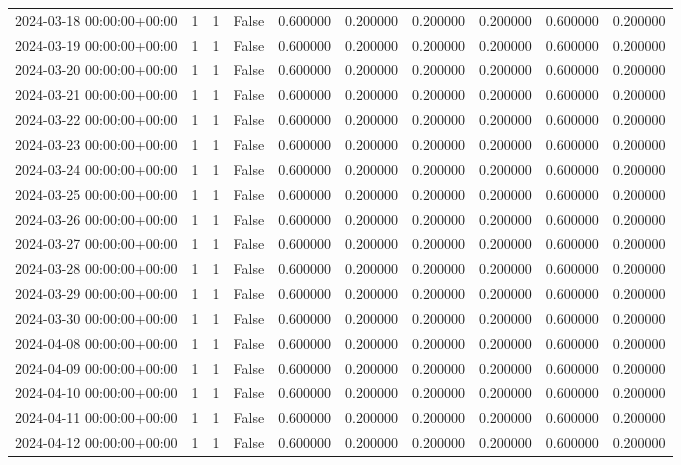 \begin{tabular}{lrrrrrrrrr}
2024-03-18 00:00:00+00:00 & 1 & 1 & False & 0.600000 & 0.200000 & 0.200000 & 0.200000 & 0.600000 & 0.200000 \\
2024-03-19 00:00:00+00:00 & 1 & 1 & False & 0.600000 & 0.200000 & 0.200000 & 0.200000 & 0.600000 & 0.200000 \\
2024-03-20 00:00:00+00:00 & 1 & 1 & False & 0.600000 & 0.200000 & 0.200000 & 0.200000 & 0.600000 & 0.200000 \\
2024-03-21 00:00:00+00:00 & 1 & 1 & False & 0.600000 & 0.200000 & 0.200000 & 0.200000 & 0.600000 & 0.200000 \\
2024-03-22 00:00:00+00:00 & 1 & 1 & False & 0.600000 & 0.200000 & 0.200000 & 0.200000 & 0.600000 & 0.200000 \\
2024-03-23 00:00:00+00:00 & 1 & 1 & False & 0.600000 & 0.200000 & 0.200000 & 0.200000 & 0.600000 & 0.200000 \\
2024-03-24 00:00:00+00:00 & 1 & 1 & False & 0.600000 & 0.200000 & 0.200000 & 0.200000 & 0.600000 & 0.200000 \\
2024-03-25 00:00:00+00:00 & 1 & 1 & False & 0.600000 & 0.200000 & 0.200000 & 0.200000 & 0.600000 & 0.200000 \\
2024-03-26 00:00:00+00:00 & 1 & 1 & False & 0.600000 & 0.200000 & 0.200000 & 0.200000 & 0.600000 & 0.200000 \\
2024-03-27 00:00:00+00:00 & 1 & 1 & False & 0.600000 & 0.200000 & 0.200000 & 0.200000 & 0.600000 & 0.200000 \\
2024-03-28 00:00:00+00:00 & 1 & 1 & False & 0.600000 & 0.200000 & 0.200000 & 0.200000 & 0.600000 & 0.200000 \\
2024-03-29 00:00:00+00:00 & 1 & 1 & False & 0.600000 & 0.200000 & 0.200000 & 0.200000 & 0.600000 & 0.200000 \\
2024-03-30 00:00:00+00:00 & 1 & 1 & False & 0.600000 & 0.200000 & 0.200000 & 0.200000 & 0.600000 & 0.200000 \\
2024-04-08 00:00:00+00:00 & 1 & 1 & False & 0.600000 & 0.200000 & 0.200000 & 0.200000 & 0.600000 & 0.200000 \\
2024-04-09 00:00:00+00:00 & 1 & 1 & False & 0.600000 & 0.200000 & 0.200000 & 0.200000 & 0.600000 & 0.200000 \\
2024-04-10 00:00:00+00:00 & 1 & 1 & False & 0.600000 & 0.200000 & 0.200000 & 0.200000 & 0.600000 & 0.200000 \\
2024-04-11 00:00:00+00:00 & 1 & 1 & False & 0.600000 & 0.200000 & 0.200000 & 0.200000 & 0.600000 & 0.200000 \\
2024-04-12 00:00:00+00:00 & 1 & 1 & False & 0.600000 & 0.200000 & 0.200000 & 0.200000 & 0.600000 & 0.200000 \\

\end{tabular}
